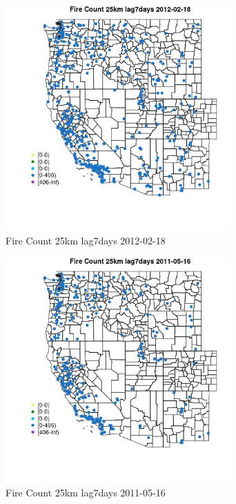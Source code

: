 \begin{figure} 
\centering  
\includegraphics[width=0.77\textwidth]{Code_Outputs/Report_ML_input_PM25_Step4_part_f_de_duplicated_aves_prioritize_24hr_obswNAs_MapObsFire_Count_25km_lag7days2012-02-18.jpg} 
\caption{\label{fig:Report_ML_input_PM25_Step4_part_f_de_duplicated_aves_prioritize_24hr_obswNAsMapObsFire_Count_25km_lag7days2012-02-18}Fire Count 25km lag7days 2012-02-18} 
\end{figure} 
 

\begin{figure} 
\centering  
\includegraphics[width=0.77\textwidth]{Code_Outputs/Report_ML_input_PM25_Step4_part_f_de_duplicated_aves_prioritize_24hr_obswNAs_MapObsFire_Count_25km_lag7days2011-05-16.jpg} 
\caption{\label{fig:Report_ML_input_PM25_Step4_part_f_de_duplicated_aves_prioritize_24hr_obswNAsMapObsFire_Count_25km_lag7days2011-05-16}Fire Count 25km lag7days 2011-05-16} 
\end{figure} 
 

